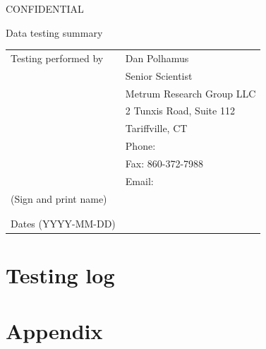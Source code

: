 \documentclass{article}
\newcommand{\topic}{Data testing summary}
\newcommand{\testinglog}{tables-testing-log-complete.pdf}
\begin{document}
\vspace*{1cm}
\begin{center}
{\large CONFIDENTIAL} 


\vspace*{1cm}


\vspace*{1cm}

{\Large \topic}
\vspace{3.0cm}
\end{center}

\newpage
\vspace*{1cm}
\begin{center}
\vspace{3.0cm}

\begin{tabular}{|l|l|}\hline
Testing performed by &   Dan Polhamus\\
                      &  Senior Scientist \\
                      &  Metrum Research Group LLC \\
                      &  2 Tunxis Road, Suite 112\\
                      &  Tariffville, CT\\
                      &  Phone:  \\
                      &  Fax: 860-372-7988 \\
                      &  Email:  \\\hline
 (Sign and print name) & \\
                       & \\
                       & \\\hline
Dates (YYYY-MM-DD)     &               \\\hline



\end{tabular}

\end{center}

\newpage

\section*{Testing log}



\newpage


\section*{Appendix}
\end{document}

